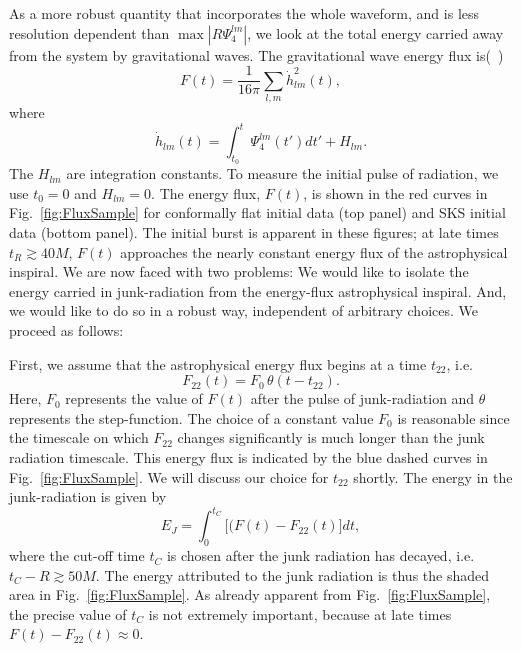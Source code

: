 As a more robust quantity that incorporates the whole waveform, and is
less resolution dependent than $\max{|R\Psi_4^{lm}|}$, we look at the
total energy carried away from the system by gravitational waves. The
 gravitational wave energy flux is(~\cite{Boyle:2008})
\begin{equation}
F(t) =\frac{1}{16\pi}\sum_{l,m}\dot{h}_{lm}^2(t),
\end{equation}
where
\begin{equation}
\dot{h}_{lm}(t)=\int_{t_0}^{t}{\Psi_4^{lm}(t')dt'} + H_{lm}.
\end{equation}
The $H_{lm}$ are integration constants.  To measure the
  initial pulse of radiation, we use $t_0=0$ and $H_{lm}=0$.  The energy flux, $F(t)$, is shown in
the red curves in Fig.~\ref{fig:FluxSample} for conformally flat initial data (top
panel) and SKS initial data (bottom panel).  The initial burst
  is apparent in these figures; at late times $t_R\gtrsim 40M$, $F(t)$
  approaches the nearly constant energy flux of the astrophysical
  inspiral.  We are now faced with two problems: We would like to
  isolate the energy carried in junk-radiation from the energy-flux
  astrophysical inspiral.  And, we would like to do so in a robust way, 
independent of arbitrary choices.  We
  proceed as follows:

  First, we assume that the astrophysical energy flux begins at a time
  $t_{22}$, i.e.
\begin{equation}
  F_{22}(t) = F_0\,\theta(t-t_{22}).
\end{equation}
Here, $F_0$ represents the value of $F(t)$ after the pulse of
junk-radiation and $\theta$ represents the step-function.
The choice of a constant value $F_0$ is reasonable since the
timescale on which $F_{22}$ changes significantly is much longer than
the junk radiation timescale.  This energy flux is indicated by the blue dashed curves in Fig.~\ref{fig:FluxSample}.
We will
discuss our choice for $t_{22}$ shortly.  The energy in the
junk-radiation is given by
\begin{equation}\label{eq:EJ}
E_J=\int_0^{t_C}\big[(F(t)-F_{22}(t)\big]dt,
\end{equation}
where the cut-off time $t_C$ is chosen after the junk radiation has
decayed, i.e. $t_C-R\gtrsim 50M$.  The energy attributed to the junk
radiation is thus the shaded area in Fig.~\ref{fig:FluxSample}.  As
already apparent from Fig.~\ref{fig:FluxSample}, the precise value of
$t_C$ is not extremely important, because at late times $F(t)-F_{22}(t)\approx 0$.  

